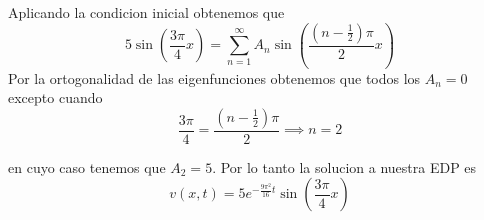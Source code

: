 \message{ !name(MAT024.tex)}\documentclass[../main.tex]{subfiles}
\begin{document}
\begin{solution}
  Aplicando la condicion inicial obtenemos que
  \begin{equation*}
    5 \sin (\frac{3\pi}{4}x) = \sum_{n = 1}^{\infty} A_{n} \sin(\frac{(n - \frac12)\pi}{2} x)
  \end{equation*}
  Por la ortogonalidad de las eigenfunciones obtenemos que todos los $A_{n} = 0$ excepto cuando
  \begin{equation*}
    \frac{3 \pi}{4} = \frac{(n - \frac{1}{2})\pi}{2} \implies n = 2
  \end{equation*}

  en cuyo caso tenemos que $A_{2} = 5$. Por lo tanto la solucion a nuestra EDP es
  \begin{equation*}
    v(x, t) = 5 e^{-\frac{9\pi^{2}}{16} t} \sin(\frac{3\pi}{4} x)
  \end{equation*}
\end{solution}
\end{document}
